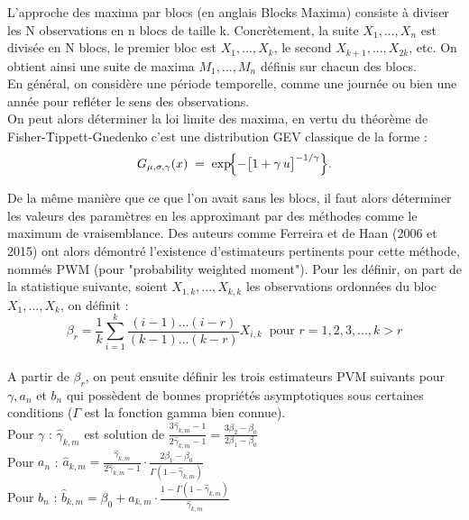 \documentclass{article}
\theoremstyle{plain}
\theoremstyle{definition}
\theoremstyle{plain}
\begin{document}
\noindent L'approche des maxima par blocs (en anglais Blocks Maxima) consiste à diviser les N observations en n blocs de taille k. Concrètement, la suite $X_1, ..., X_n$ est divisée en N blocs, le premier bloc est $X_1, ..., X_k$, le second $X_{k+1}, ..., X_{2k}$, etc. On obtient ainsi une suite de maxima $M_1, ..., M_n$ définis sur chacun des blocs.\\
\noindent En général, on considère une période temporelle, comme une journée ou bien une année pour refléter le sens des observations.  \\
\noindent On peut alors déterminer la loi limite des maxima, en vertu du théorème de Fisher-Tippett-Gnedenko c'est une distribution GEV classique de la forme :
\[
G_{\mu,\sigma,\gamma}(x)
\;=\;
\exp\!\Bigl\{-\bigl[1 + \gamma\,u\bigr]^{-1/\gamma}\Bigr\}.
\]

\noindent De la même manière que ce que l'on avait sans les blocs, il faut alors déterminer les valeurs des paramètres en les approximant par des méthodes comme le maximum de vraisemblance. Des auteurs comme Ferreira et de Haan (2006 et 2015) ont alors démontré l'existence d'estimateurs pertinents pour cette méthode, nommés PWM (pour "probability weighted moment"). Pour les définir, on part de la statistique suivante, soient $X_{1,k}, ..., X_{k,k}$ les observations ordonnées du bloc $X_1, ..., X_k$, on définit :
\[
\beta_r = \frac{1}{k} \sum_{i=1}^{k} \frac{(i-1)...(i-r)}{(k-1)...(k-r)} X_{i,k} ~ \text{ pour $r = 1,2,3,...,k>r $}
\] \\
\noindent A partir de $\beta_r$, on peut ensuite définir les trois estimateurs PVM suivants pour $\gamma, a_n$ et $b_n$ qui possèdent de bonnes propriétés asymptotiques sous certaines conditions ($\Gamma$ est la fonction gamma bien connue). \\

\noindent Pour $\gamma$ : $\hat{\gamma}_{k,m}$ est solution de $\frac{3\hat{\gamma}_{k,m} - 1}{2\hat{\gamma}_{k,m} - 1} = \frac{3\beta_2 - \beta_0}{2\beta_1 - \beta_0} $ \\
\noindent Pour $a_n$ : $\hat{a}_{k,m} = \frac{\hat{\gamma}_{k,m}}{2\hat{\gamma}_{k,m} - 1} \cdot \frac{2\beta_1 - \beta_0}{\Gamma(1 - \hat{\gamma}_{k,m})}$ \\
\noindent Pour $b_n$ : $\hat{b}_{k,m} = \beta_0 + \hat{a}_{k,m} \cdot \frac{1 - \Gamma(1 - \hat{\gamma}_{k,m})}{\hat{\gamma}_{k,m}}$ \\
\end{document}

